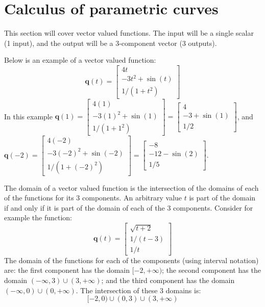\documentclass{article}
\begin{document}
\section*{Calculus of parametric curves}

This section will cover vector valued functions. The input will be a single scalar (1 input), and the output will be a 3-component vector (3 outputs). 

Below is an example of a vector valued function:
\[\mathbf{q}(t) = \begin{bmatrix} 4t \\ -3t^2 + \sin(t) \\ 1/(1 + t^2) \end{bmatrix}\]
In this example \(\mathbf{q}(1) = \begin{bmatrix} 4(1) \\ -3(1)^2 + \sin(1) \\ 1/(1 + 1^2) \end{bmatrix} = \begin{bmatrix} 4 \\ -3 + \sin(1) \\ 1/2 \end{bmatrix}\), and \\ \(\mathbf{q}(-2) = \begin{bmatrix} 4(-2) \\ -3(-2)^2 + \sin(-2) \\ 1/(1 + (-2)^2) \end{bmatrix} = \begin{bmatrix} -8 \\ -12 - \sin(2) \\ 1/5 \end{bmatrix}\).


The domain of a vector valued function is the intersection of the domains of each of the functions for its 3 components. An arbitrary value \(t\) is part of the domain if and only if it is part of the domain of each of the 3 components. Consider for example the function:
\[\mathbf{q}(t) = \begin{bmatrix} \sqrt{t + 2} \\ 1/(t - 3) \\ 1/t \end{bmatrix}\]
The domain of the functions for each of the components (using interval notation) are: the first component has the domain \([-2, +\infty)\); the second component has the domain \((-\infty, 3) \cup (3, +\infty)\); and the third component has the domain \((-\infty, 0) \cup (0, +\infty)\). The intersection of these 3 domains is:
\[[-2, 0) \cup (0, 3) \cup (3, +\infty)\]
\end{document}
